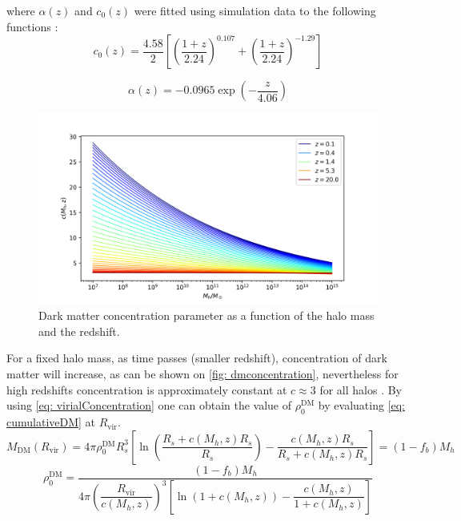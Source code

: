 		where $\alpha(z)$ and $c_0(z)$ were fitted using simulation data to the following functions \cite{choksi2017recoiling}:
		\begin{equation}
			c_0(z) = \dfrac{4.58}{2}\left[\left(\dfrac{1 + z}{2.24}\right)^{0.107} + \left(\dfrac{1 + z}{2.24}\right)^{-1.29}\right]
		\end{equation}
		
		\begin{equation}
			\alpha(z) = -0.0965 \exp\left(-\dfrac{z}{4.06}\right)
		\end{equation}
	
		\begin{figure}[h]
			\centering
			\includegraphics[width=0.7\linewidth]{"../Files/Week 3/darkmatter_concentration"}
			\caption{Dark matter concentration parameter as a function of the halo mass and the redshift.}
			\label{fig: dmconcentration}
		\end{figure}
	
		For a fixed halo mass, as time passes (smaller redshift), concentration of dark matter will increase, as can be shown on \autoref{fig: dmconcentration}, nevertheless for high redshifts concentration is approximately constant at $c \approx 3$ for all halos \cite{choksi2017recoiling}. By using \autoref{eq: virialConcentration} one can obtain the value of $\rho_0^\text{DM}$ by evaluating \autoref{eq: cumulativeDM} at $R_\text{vir}$.
		\begin{equation}\label{eq: dmM_virial}
			M_\text{DM}(R_\text{vir}) = 4\pi\rho_0^\text{DM}R_s^3 \left[\ln\left(\dfrac{R_s + c(M_h, z)R_s}{R_s}\right) - \dfrac{c(M_h, z)R_s}{R_s + c(M_h, z)R_s}\right] = (1 - f_b)M_h
		\end{equation}
		\begin{equation}\label{eq: rho0dm}
			\rho_0^\text{DM} = \dfrac{(1 - f_b)M_h}{4\pi \left(\dfrac{R_\text{vir}}{c(M_h, z)}\right)^3 \left[\ln\left(1 + c(M_h, z)\right) - \dfrac{c(M_h, z)}{1 + c(M_h, z)}\right]}
		\end{equation}
	
